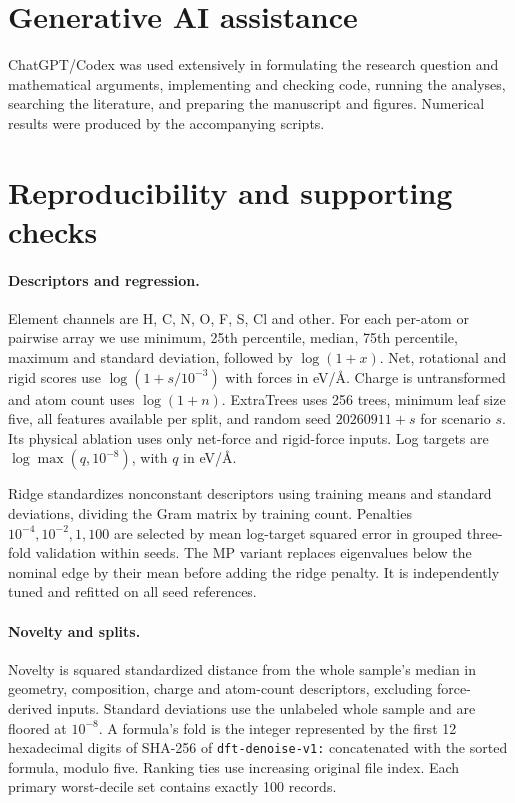 \documentclass[11pt]{article}
\begin{document}
\section*{Generative AI assistance}
ChatGPT/Codex was used extensively in formulating the research question and
mathematical arguments, implementing and checking code, running the analyses,
searching the literature, and preparing the manuscript and figures. Numerical
results were produced by the accompanying scripts.

\appendix
\section{Reproducibility and supporting checks}
\paragraph{Descriptors and regression.}
Element channels are H, C, N, O, F, S, Cl and other. For each per-atom or pairwise
array we use minimum, 25th percentile, median, 75th percentile, maximum and standard
deviation, followed by $\log(1+x)$. Net, rotational and rigid scores use
$\log(1+s/10^{-3})$ with forces in eV/\AA. Charge is untransformed and atom count
uses $\log(1+n)$. ExtraTrees uses 256 trees, minimum leaf size five, all features
available per split, and random seed $20260911+s$ for scenario $s$. Its physical
ablation uses only net-force and rigid-force inputs. Log targets are
$\log\max(q,10^{-8})$, with $q$ in eV/\AA.

Ridge standardizes nonconstant descriptors using training means and standard
deviations, dividing the Gram matrix by training count. Penalties
$10^{-4},10^{-2},1,100$ are selected by mean log-target squared error in grouped
three-fold validation within seeds. The MP variant replaces eigenvalues below
the nominal edge by their mean before adding the ridge penalty. It is
independently tuned and refitted on all seed references.

\paragraph{Novelty and splits.}
Novelty is squared standardized distance from the whole sample's median in geometry,
composition, charge and atom-count descriptors, excluding force-derived inputs.
Standard deviations use the unlabeled whole sample and are floored at $10^{-8}$.
A formula's fold is the integer represented by the first 12 hexadecimal digits
of SHA-256 of \texttt{dft-denoise-v1:} concatenated with the sorted formula, modulo
five. Ranking ties use increasing original file index. Each primary worst-decile
set contains exactly 100 records.
\end{document}
